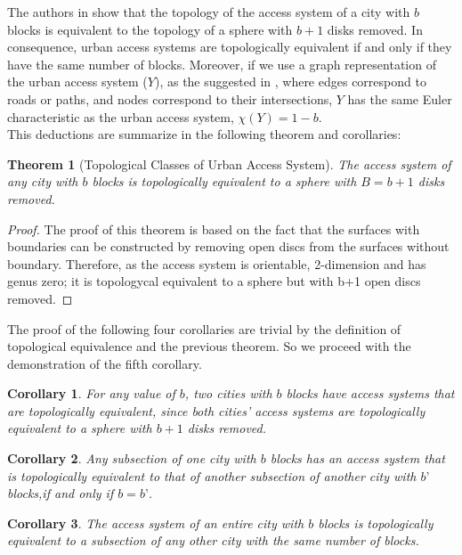 \documentclass[10pt]{article}
\newtheorem{theorem}{Theorem}
\newtheorem{corollary}{Corollary}[theorem]
\begin{document}

The authors in \cite{bre} show that the topology of  the access system of a city with $b$ blocks is equivalent to the topology of a sphere with $b+1$ disks removed. In consequence, urban access systems are topologically equivalent if and only if they have the same number of blocks. Moreover, if we use a graph representation of the urban access system ($Y$), as the suggested in \cite{por}, where edges correspond to roads or paths, and nodes correspond to their intersections, $Y$ has the same Euler characteristic as the urban access system, $\chi(Y) = 1 - b$.\\

This deductions are summarize in the following theorem and corollaries:\\
\begin{theorem}[Topological Classes of Urban Access System]
The access system of any city with $b$ blocks is topologically equivalent to a sphere with $B=b+1$ disks removed.
\end{theorem}
\begin{proof}
The proof of this theorem is based on the fact that the surfaces with boundaries can be constructed by removing open discs from the surfaces without boundary. Therefore, as the access system is orientable, 2-dimension and has genus zero; it is topologycal equivalent to a sphere but with b+1 open discs removed. 
\end{proof}

The proof of the following four corollaries are trivial by the definition of topological equivalence and the previous theorem. So we proceed with the demonstration of the fifth corollary.

\begin{corollary}
    For any value of $b$, two cities with $b$ blocks have access systems that are topologically equivalent, since both cities’ access systems are topologically equivalent to a sphere with $b+1$ disks removed.
\end{corollary}

\begin{corollary}
    Any subsection of one city with $b$ blocks has an access system that is topologically equivalent to that of another subsection of another city with $b’$ blocks,if and only if $b=b’$.
\end{corollary}

\begin{corollary}
    The access system of an entire city with $b$ blocks is topologically equivalent to a subsection of any other city with the same number of blocks.
\end{corollary}
\end{document}
